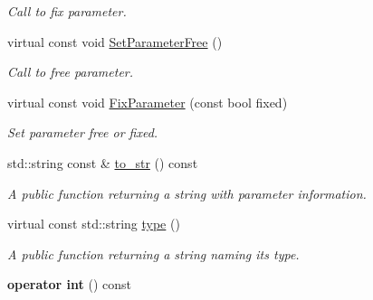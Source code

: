 \begin{DoxyCompactItemize}
\begin{DoxyCompactList}\small\item\em Call to fix parameter. \end{DoxyCompactList}\item 
\hypertarget{class_integer_parameter_aaf5d8de1cad5e36a8390a4f1c6a1e4e1}{virtual const void \hyperlink{class_integer_parameter_aaf5d8de1cad5e36a8390a4f1c6a1e4e1}{Set\-Parameter\-Free} ()}\label{class_integer_parameter_aaf5d8de1cad5e36a8390a4f1c6a1e4e1}

\begin{DoxyCompactList}\small\item\em Call to free parameter. \end{DoxyCompactList}\item 
\hypertarget{class_integer_parameter_addaf4594889140804622055648cb4205}{virtual const void \hyperlink{class_integer_parameter_addaf4594889140804622055648cb4205}{Fix\-Parameter} (const bool fixed)}\label{class_integer_parameter_addaf4594889140804622055648cb4205}

\begin{DoxyCompactList}\small\item\em Set parameter free or fixed. \end{DoxyCompactList}\item 
std\-::string const \& \hyperlink{class_integer_parameter_a6e4a624ea0599cffcfc5f420b7931a36}{to\-\_\-str} () const 
\begin{DoxyCompactList}\small\item\em A public function returning a string with parameter information. \end{DoxyCompactList}\item 
virtual const std\-::string \hyperlink{class_integer_parameter_ae1452a0f19fa7c5140b12f39c6fd1300}{type} ()
\begin{DoxyCompactList}\small\item\em A public function returning a string naming its type. \end{DoxyCompactList}\item 
\hypertarget{class_integer_parameter_a4d4097e57daf46dfb5131ede39acc578}{{\bfseries operator int} () const }\label{class_integer_parameter_a4d4097e57daf46dfb5131ede39acc578}

\end{DoxyCompactItemize}
